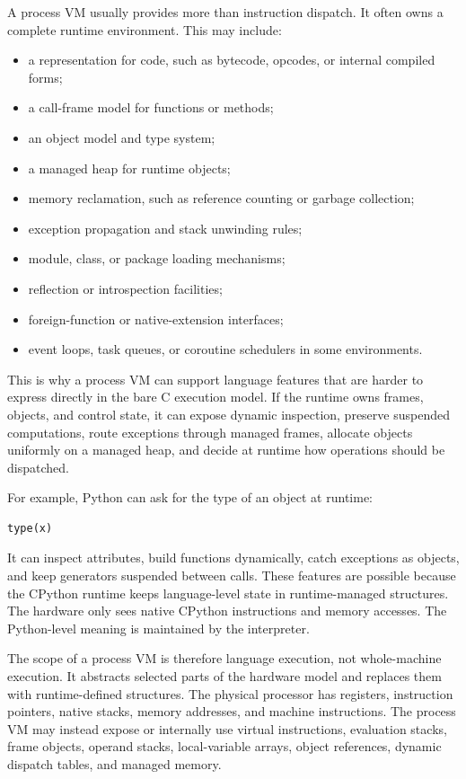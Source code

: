 \documentclass[a4paper,twoside]{report}
\begin{document}
A process VM usually provides more than instruction dispatch. It often owns a complete runtime environment. This may include:

\begin{itemize}
    \item a representation for code, such as bytecode, opcodes, or internal compiled forms;
    \item a call-frame model for functions or methods;
    \item an object model and type system;
    \item a managed heap for runtime objects;
    \item memory reclamation, such as reference counting or garbage collection;
    \item exception propagation and stack unwinding rules;
    \item module, class, or package loading mechanisms;
    \item reflection or introspection facilities;
    \item foreign-function or native-extension interfaces;
    \item event loops, task queues, or coroutine schedulers in some environments.
\end{itemize}

This is why a process VM can support language features that are harder to express directly in the bare C execution model. If the runtime owns frames, objects, and control state, it can expose dynamic inspection, preserve suspended computations, route exceptions through managed frames, allocate objects uniformly on a managed heap, and decide at runtime how operations should be dispatched.

For example, Python can ask for the type of an object at runtime:

\begin{verbatim}
type(x)
\end{verbatim}

It can inspect attributes, build functions dynamically, catch exceptions as objects, and keep generators suspended between calls. These features are possible because the CPython runtime keeps language-level state in runtime-managed structures. The hardware only sees native CPython instructions and memory accesses. The Python-level meaning is maintained by the interpreter.

The scope of a process VM is therefore language execution, not whole-machine execution. It abstracts selected parts of the hardware model and replaces them with runtime-defined structures. The physical processor has registers, instruction pointers, native stacks, memory addresses, and machine instructions. The process VM may instead expose or internally use virtual instructions, evaluation stacks, frame objects, operand stacks, local-variable arrays, object references, dynamic dispatch tables, and managed memory.
\end{document}
